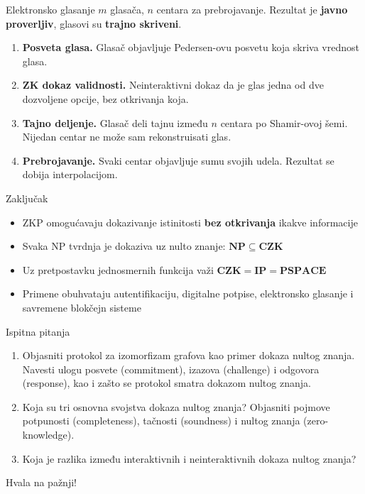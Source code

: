 ﻿\documentclass[aspectratio=1610]{beamer}
\newcommand{\keyword}[1]{\textcolor{wcprimary}{\textbf{#1}}}
\begin{document}
\begin{frame}{Elektronsko glasanje}
\vspace{4pt}
{\small $m$ glasača, $n$ centara za prebrojavanje. Rezultat je \keyword{javno proverljiv}, glasovi su \keyword{trajno skriveni}.}
\vspace{8pt}
\begin{enumerate}\itemsep8pt
  \item \keyword{Posveta glasa.}
  Glasač objavljuje Pedersen-ovu posvetu koja skriva vrednost glasa.

  \item \keyword{ZK dokaz validnosti.}
  Neinteraktivni dokaz da je glas jedna od dve dozvoljene opcije,
  bez otkrivanja koja.

  \item \keyword{Tajno deljenje.}
  Glasač deli tajnu između $n$ centara po Shamir-ovoj šemi.
  Nijedan centar ne može sam rekonstruisati glas.

  \item \keyword{Prebrojavanje.}
  Svaki centar objavljuje sumu svojih udela.
  Rezultat se dobija interpolacijom.
\end{enumerate}
\end{frame}

\begin{frame}{Zaključak}
\vspace{10pt}
\begin{itemize}\itemsep10pt
  \item ZKP omogućavaju dokazivanje istinitosti \keyword{bez otkrivanja} ikakve informacije
  \item Svaka NP tvrdnja je dokaziva uz nulto znanje: $\mathbf{NP} \subseteq \mathbf{CZK}$
  \item Uz pretpostavku jednosmernih funkcija važi $\mathbf{CZK} = \mathbf{IP} = \mathbf{PSPACE}$
  \item Primene obuhvataju autentifikaciju, digitalne potpise, elektronsko glasanje i savremene blokčejn sisteme
\end{itemize}
\end{frame}

\begin{frame}{Ispitna pitanja}
\begin{enumerate}
    \item Objasniti protokol za izomorfizam grafova kao primer dokaza nultog znanja. Navesti ulogu posvete (commitment), izazova (challenge) i odgovora (response), kao i zašto se protokol smatra dokazom nultog znanja.

    \vspace{0.4cm}

    \item Koja su tri osnovna svojstva dokaza nultog znanja? Objasniti pojmove potpunosti (completeness), tačnosti (soundness) i nultog znanja (zero-knowledge).

    \vspace{0.4cm}

    \item Koja je razlika između interaktivnih i neinteraktivnih dokaza nultog znanja?
\end{enumerate}
\end{frame}

\begin{frame}{}
\begin{center}
  \Huge Hvala na pažnji!
\end{center}
\end{frame}
\end{document}
